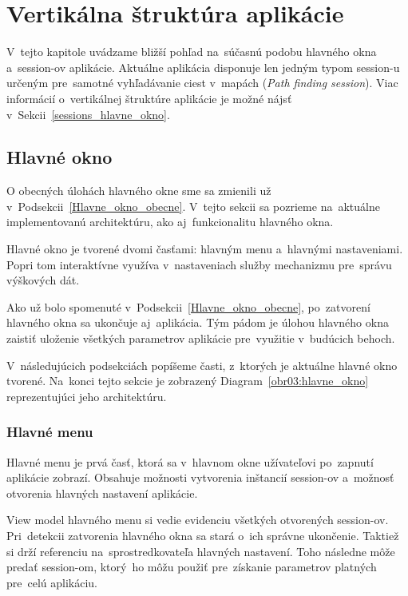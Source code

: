 \chapter{Vertikálna štruktúra aplikácie}

V~tejto kapitole uvádzame bližší pohľad na~súčasnú podobu hlavného okna a~session-ov aplikácie. Aktuálne aplikácia disponuje len jedným typom session-u určeným pre~samotné vyhľadávanie ciest v~mapách (\textit{Path finding session}). Viac informácií o~vertikálnej štruktúre aplikácie je možné nájsť v~Sekcii~\ref{sessions_hlavne_okno}.

\section{Hlavné okno}

O obecných úlohách hlavného okne sme sa zmienili už v~Podsekcii~\ref{Hlavne_okno_obecne}. V~tejto sekcii sa pozrieme na~aktuálne implementovanú architektúru, ako aj~funkcionalitu hlavného okna.


Hlavné okno je tvorené dvomi časťami: hlavným menu a~hlavnými nastaveniami.
Popri tom interaktívne využíva v~nastaveniach služby mechanizmu pre~správu výškových dát.

Ako už bolo spomenuté v~Podsekcii~\ref{Hlavne_okno_obecne}, po~zatvorení hlavného okna sa ukončuje aj~aplikácia. Tým pádom je úlohou hlavného okna zaistiť uloženie všetkých parametrov aplikácie pre~využitie v~budúcich behoch.

V~následujúcich podsekciách popíšeme časti, z~ktorých je aktuálne hlavné okno tvorené. Na~konci tejto sekcie je zobrazený Diagram~\ref{obr03:hlavne_okno} reprezentujúci jeho architektúru.

\subsection{Hlavné menu}

Hlavné menu je prvá časť, ktorá sa v~hlavnom okne užívateľovi po~zapnutí aplikácie zobrazí. Obsahuje možnosti vytvorenia inštancií session-ov a~možnosť otvorenia hlavných nastavení aplikácie. 

View model hlavného menu si vedie evidenciu všetkých otvorených session-ov. Pri~detekcii zatvorenia hlavného okna sa stará o~ich správne ukončenie. Taktiež si drží referenciu na~sprostredkovateľa hlavných nastavení. Toho následne môže predať session-om, ktorý~ho môžu použiť pre~získanie parametrov platných pre~celú aplikáciu.

